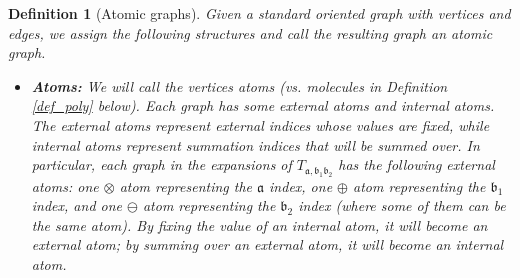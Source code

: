 \documentclass{article}
\newcommand{\1}{\mathds{1}}
\numberwithin{equation}{section}
\newcommand{\fa}{{\mathfrak a}}
\newcommand{\fb}{{\mathfrak b}}
\theoremstyle{plain} %
\newtheorem{definition}[theorem]{Definition}
\theoremstyle{remark}
\newcommand{\cor}{\color{red}}
\newcommand{\hty}[1]{{\cor (ht: #1) }}
\begin{document}
\begin{definition}[Atomic graphs] \label{def_graph1} 
Given a standard oriented graph with vertices and edges, we assign the following structures and call the resulting graph an atomic graph.  

\begin{itemize}
%
%

\item {\bf Atoms:} We will call the vertices atoms (vs. molecules in Definition \ref{def_poly} below). Each graph has some external atoms and internal atoms. The external atoms represent external indices whose values are fixed, while internal atoms represent summation indices that will be summed over. In particular, each graph in the expansions of $T_{\fa,\fb_1\fb_2}$ has the following %
external atoms: one $\otimes$ atom representing  the $\fa$ index, one $\oplus$ atom representing  the $\fb_1$ index, and one $\ominus$ atom representing the $\fb_2$ index (where some of them can be the same atom). %
By fixing the value of an internal atom, it will become an external atom; by summing over an external atom, it will become an internal atom. %
 

\end{itemize}
\end{definition}
\end{document}
